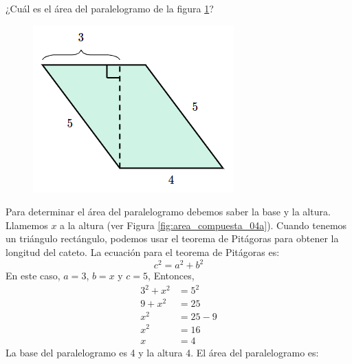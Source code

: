 ¿Cuál es el \'area del paralelogramo de la figura \ref{fig:area_compuesta_04}?

\begin{figure}[H]
    \begin{center}
        \includegraphics[width=0.3\linewidth]{../images/area_compuesta_04.png}
    \end{center}
    \caption{}
    \label{fig:area_compuesta_04}
\end{figure}
\begin{solutionbox}{15cm}

    \begin{minipage}{0.6\textwidth}
        Para determinar el área del paralelogramo debemos saber la base y la altura. Llamemos $x$ a la altura (ver Figura \ref{fig:area_compuesta_04a}).
        Cuando tenemos un triángulo rectángulo, podemos usar el teorema de Pitágoras para obtener la longitud del cateto.
        La ecuación para el teorema de Pitágoras es:
        \[c^2=a^2+b^2\]
        En este caso, $a=3$, $b=x$ y $c=5$, Entonces,
        \begin{align*}
            3^2+x^2 & =5^2  \\
            9+x^2   & =25   \\
            x^2     & =25-9 \\
            x^2     & =16   \\
            x       & =4
        \end{align*}
        La base del paralelogramo es 4 y la altura 4. El área del paralelogramo es:


\end{minipage}
\end{solutionbox}
